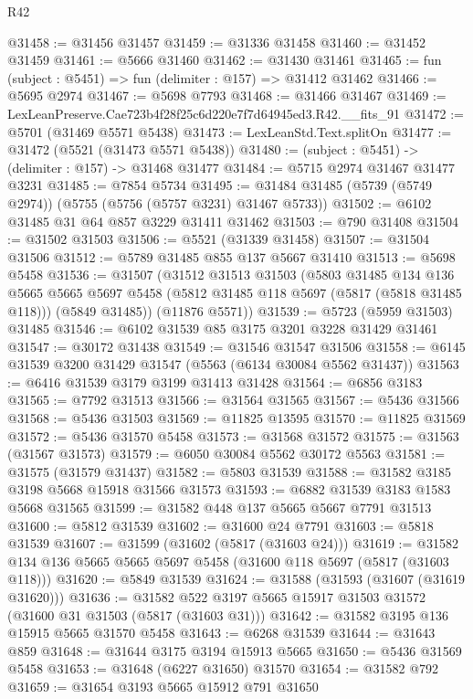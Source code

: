 \begin{lexlean}{R42}
\begin{coremodule}
@31458 := @31456 @31457
@31459 := @31336 @31458
@31460 := @31452 @31459
@31461 := @5666 @31460
@31462 := @31430 @31461
@31465 := fun (subject : @5451) => fun (delimiter : @157) => @31412 @31462
@31466 := @5695 @2974
@31467 := @5698 @7793
@31468 := @31466 @31467
@31469 := LexLeanPreserve.Cae723b4f28f25c6d220e7f7d64945ed3.R42.__fits_91
@31472 := @5701 (@31469 @5571 @5438)
@31473 := LexLeanStd.Text.splitOn
@31477 := @31472 (@5521 (@31473 @5571 @5438))
@31480 := (subject : @5451) -> (delimiter : @157) -> @31468 @31477
@31484 := @5715 @2974 @31467 @31477 @3231
@31485 := @7854 @5734
@31495 := @31484 @31485 (@5739 (@5749 @2974)) (@5755 (@5756 (@5757 @3231) @31467 @5733))
@31502 := @6102 @31485 @31 @64 @857 @3229 @31411 @31462
@31503 := @790 @31408
@31504 := @31502 @31503
@31506 := @5521 (@31339 @31458)
@31507 := @31504 @31506
@31512 := @5789 @31485 @855 @137 @5667 @31410
@31513 := @5698 @5458
@31536 := @31507
    (@31512
      @31513
      @31503
      (@5803
        @31485
        @134
        @136
        @5665
        @5665
        @5697
        @5458
        (@5812 @31485 @118 @5697 (@5817 (@5818 @31485 @118)))
        (@5849 @31485))
      (@11876 @5571))
@31539 := @5723 (@5959 @31503) @31485
@31546 := @6102 @31539 @85 @3175 @3201 @3228 @31429 @31461
@31547 := @30172 @31438
@31549 := @31546 @31547 @31506
@31558 := @6145 @31539 @3200 @31429 @31547 (@5563 (@6134 @30084 @5562 @31437))
@31563 := @6416 @31539 @3179 @3199 @31413 @31428
@31564 := @6856 @3183
@31565 := @7792 @31513
@31566 := @31564 @31565
@31567 := @5436 @31566
@31568 := @5436 @31503
@31569 := @11825 @13595
@31570 := @11825 @31569
@31572 := @5436 @31570 @5458
@31573 := @31568 @31572
@31575 := @31563 (@31567 @31573)
@31579 := @6050 @30084 @5562 @30172 @5563
@31581 := @31575 (@31579 @31437)
@31582 := @5803 @31539
@31588 := @31582 @3185 @3198 @5668 @15918 @31566 @31573
@31593 := @6882 @31539 @3183 @1583 @5668 @31565
@31599 := @31582 @448 @137 @5665 @5667 @7791 @31513
@31600 := @5812 @31539
@31602 := @31600 @24 @7791
@31603 := @5818 @31539
@31607 := @31599 (@31602 (@5817 (@31603 @24)))
@31619 := @31582 @134 @136 @5665 @5665 @5697 @5458 (@31600 @118 @5697 (@5817 (@31603 @118)))
@31620 := @5849 @31539
@31624 := @31588 (@31593 (@31607 (@31619 @31620)))
@31636 := @31582 @522 @3197 @5665 @15917 @31503 @31572 (@31600 @31 @31503 (@5817 (@31603 @31)))
@31642 := @31582 @3195 @136 @15915 @5665 @31570 @5458
@31643 := @6268 @31539
@31644 := @31643 @859
@31648 := @31644 @3175 @3194 @15913 @5665
@31650 := @5436 @31569 @5458
@31653 := @31648 (@6227 @31650) @31570
@31654 := @31582 @792
@31659 := @31654 @3193 @5665 @15912 @791 @31650

\end{coremodule}
\end{lexlean}
